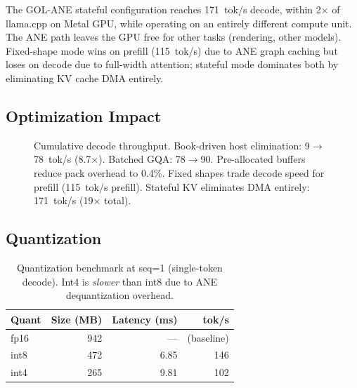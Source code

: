 \documentclass[11pt,twocolumn]{article}
\begin{document}
The GOL-ANE stateful configuration reaches 171~tok/s decode, within
2$\times$ of llama.cpp on Metal GPU, while operating on an entirely
different compute unit. The ANE path leaves the GPU free for other
tasks (rendering, other models). Fixed-shape mode wins on prefill
(115~tok/s) due to ANE graph caching but loses on decode due to
full-width attention; stateful mode dominates both by eliminating KV
cache DMA entirely.

\subsection{Optimization Impact}

\begin{figure}[t]
\centering
{}
\caption{Cumulative decode throughput. Book-driven host elimination:
9$\to$78~tok/s (8.7$\times$). Batched GQA: 78$\to$90. Pre-allocated
buffers reduce pack overhead to 0.4\%. Fixed shapes trade decode
speed for prefill (115~tok/s prefill). Stateful KV eliminates DMA
entirely: 171~tok/s (19$\times$ total).}
\label{fig:optbar}
\end{figure}

\subsection{Quantization}

\begin{table}[t]
\centering
\footnotesize
\begin{tabular}{lrrr}
\toprule
\textbf{Quant} & \textbf{Size (MB)} & \textbf{Latency (ms)} & \textbf{tok/s} \\
\midrule
fp16 & 942 & --- & (baseline) \\
int8 & 472 & 6.85 & 146 \\
int4 & 265 & 9.81 & 102 \\
\bottomrule
\end{tabular}
\caption{Quantization benchmark at seq=1 (single-token decode). Int4
is \emph{slower} than int8 due to ANE dequantization overhead.}
\label{tab:quant}
\end{table}
\end{document}
